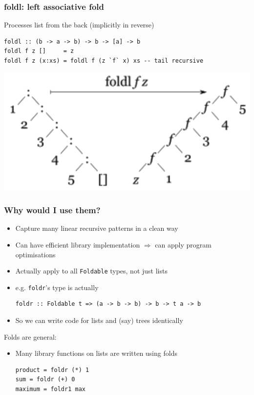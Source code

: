 \documentclass{article}[18pt]
\begin{document}
\subsubsection{foldl: left associative fold}
Processes list from the back (implicitly in reverse)
\begin{verbatim}
foldl :: (b -> a -> b) -> b -> [a] -> b
foldl f z []     = z
foldl f z (x:xs) = foldl f (z `f` x) xs -- tail recursive
\end{verbatim}
\begin{center}
	\includegraphics[scale=0.6]{foldl}
\end{center}
\subsubsection{Why would I use them?}
\begin{itemize}
	\item Capture many linear recursive patterns in a clean way
	\item Can have efficient library implementation $\Rightarrow$ can apply program optimisations
	\item Actually apply to all \texttt{Foldable} types, not just lists
	\item e.g. \texttt{foldr}'s type is actually
\begin{verbatim}
foldr :: Foldable t => (a -> b -> b) -> b -> t a -> b
\end{verbatim}
	\item So we can write code for lists and (say) trees identically
\end{itemize}
Folds are general:
\begin{itemize}
	\item Many library functions on lists are written using folds
\begin{verbatim}
product = foldr (*) 1
sum = foldr (+) 0
maximum = foldr1 max
\end{verbatim}
\end{itemize}
\end{document}
